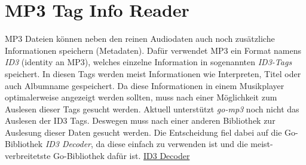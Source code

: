 \section{MP3 Tag Info Reader}
MP3 Dateien können neben den reinen Audiodaten auch noch zusätzliche
Informationen speichern (Metadaten). Dafür verwendet MP3 ein Format namens
\textit{ID3} (identity an MP3), welches einzelne Information in
sogenannten \textit{ID3-Tags} speichert. In diesen Tags werden meist
Informationen wie Interpreten, Titel oder auch Albumname gespeichert. Da diese
Informationen in einem Musikplayer optimalerweise angezeigt werden sollten,
muss nach einer Möglichkeit zum Auslesen dieser Tags gesucht werden. \hfill
\break
Aktuell unterstützt \textit{go-mp3} noch nicht das Auslesen der ID3 Tags.
Deswegen muss nach einer anderen Bibliothek zur Auslesung dieser Daten gesucht
werden. Die Entscheidung fiel dabei auf die Go-Bibliothek \textit{ID3 Decoder},
da diese einfach zu verwenden ist und die meist-verbreitetste Go-Bibliothek
dafür ist.
\href{https://github.com/mikkyang/id3-go}{ID3 Decoder}
